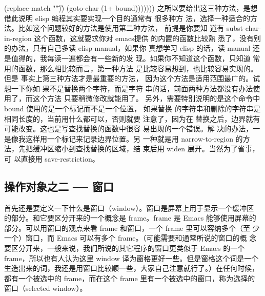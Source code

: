 \documentclass[11pt]{ctexart}
\begin{document}
{{{{(replace-match "\t"))
(goto-char (1+ bound)))))))
之所以要给出这三种方法，是想借此说明 elisp 编程其实要实现一个目的通常有 很多种方
法，选择一种适合的方法。比如这个问题较好的方法是使用第二种方法， 前提是你要知
道有 subst-char-in-region 这个函数，这就要求你对 emacs提供 的内置的函数比较熟
悉了，没有别的办法，只有自己多读 elisp manual，如果你 真想学习 elisp 的话，读
manual 还是值得的，我每读一遍都会有一些新的发 现。如果你不知道这个函数，只知道
常用的函数，那么相比较而言，第一种方法 是比较容易想到，也比较容易实现的。但是
事实上第三种方法才是最重要的方法， 因为这个方法是适用范围最广的。试想一下你如
果不是替换两个字符，而是字符 串的话，前面两种方法都没有办法使用了，而这个方法
只要稍微修改就能用了。
另外，需要特别说明的是这个命令中 bound 使用的是一个标记而不是一个位置， 如果替换
的字符串和删除的字符串是相同长度的，当前用什么都可以，否则就要 注意了，因为在
替换之后，边界就有可能改变。这也是写查找替换的函数中很容 易出现的一个错误。解
决的办法，一是像我这样用一个标记来记录边界位置。另 一种就是用 narrow-to-region
的方法，先把缓冲区缩小到查找替换的区域，结 束后用 widen 展开。当然为了省事，可
以直接用 save-restriction。

\subsection{操作对象之二 ── 窗口}
\label{sec:org22ba30e}

首先还是要定义一下什么是窗口（window）。窗口是屏幕上用于显示一个缓冲区 的部分。和它要区分开来的一个概念是 frame。frame 是 Emacs 能够使用屏幕的 部分。可以用窗口的观点来看 frame 和窗口，一个 frame 里可以容纳多个（至 少一个）窗口，而 Emacs 可以有多个 frame。（可能需要和通常所说的窗口的概 念要区分开来，一般来说，我们所说的其它程序的窗口更类似于 Emacs 的一个 frame，所以也有人认为这里 window 译为窗格更好一些。但是窗格这个词是一个 生造出来的词，我还是用窗口比较顺一些，大家自己注意就行了。）在任何时候， 都有一个被选中的 frame，而在这个 frame 里有一个被选中的窗口，称为选择的 窗口（selected window）。
}}}}
\end{document}
